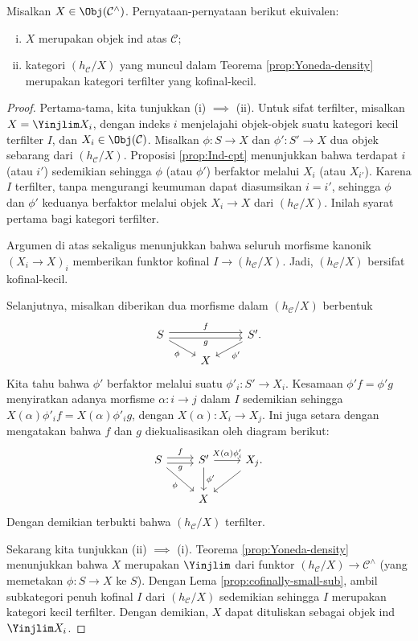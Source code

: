 \begin{proposition}\label{prop:recognize-ind}
	Misalkan $X \in \Obj(\mathcal{C}^\wedge)$. Pernyataan-pernyataan berikut ekuivalen:
	\begin{enumerate}[(i)]
		\item $X$ merupakan objek ind atas $\mathcal{C}$;
		\item kategori $(h_{\mathcal{C}}/X)$ yang muncul dalam Teorema \ref{prop:Yoneda-density} merupakan kategori terfilter yang kofinal-kecil.
	\end{enumerate}
\end{proposition}
\begin{proof}
	Pertama-tama, kita tunjukkan (i) $\implies$ (ii). Untuk sifat terfilter, misalkan $X = \Yinjlim X_i$, dengan indeks $i$ menjelajahi objek-objek suatu kategori kecil terfilter $I$, dan $X_i \in \Obj(\mathcal{C})$. Misalkan $\phi: S \to X$ dan $\phi': S' \to X$ dua objek sebarang dari $(h_{\mathcal{C}}/X)$. Proposisi \ref{prop:Ind-cpt} menunjukkan bahwa terdapat $i$ (atau $i'$) sedemikian sehingga $\phi$ (atau $\phi'$) berfaktor melalui $X_i$ (atau $X_{i'}$). Karena $I$ terfilter, tanpa mengurangi keumuman dapat diasumsikan $i = i'$, sehingga $\phi$ dan $\phi'$ keduanya berfaktor melalui objek $X_i \to X$ dari $(h_{\mathcal{C}}/X)$. Inilah syarat pertama bagi kategori terfilter.
	
	Argumen di atas sekaligus menunjukkan bahwa seluruh morfisme kanonik $(X_i \to X)_i$ memberikan funktor kofinal $I \to (h_{\mathcal{C}}/X)$. Jadi, $(h_{\mathcal{C}}/X)$ bersifat kofinal-kecil.
	
	Selanjutnya, misalkan diberikan dua morfisme dalam $(h_{\mathcal{C}}/X)$ berbentuk
	\[\begin{tikzcd}[row sep=small]
		S \arrow[rr, shift left, "f"] \arrow[rr, shift right, "g"'] \arrow[rd, "\phi"'] & & S' . \arrow[ld, "{\phi'}"] \\
		& X &
	\end{tikzcd}\]
	Kita tahu bahwa $\phi'$ berfaktor melalui suatu $\phi'_i: S' \to X_i$. Kesamaan $\phi' f = \phi' g$ menyiratkan adanya morfisme $\alpha: i \to j$ dalam $I$ sedemikian sehingga $X(\alpha) \phi'_i f = X(\alpha) \phi'_i g$, dengan $X(\alpha): X_i \to X_j$. Ini juga setara dengan mengatakan bahwa $f$ dan $g$ diekualisasikan oleh diagram berikut:
	\[\begin{tikzcd}
		S \arrow[r, shift left, "f"] \arrow[r, shift right, "g"'] \arrow[rd, "\phi"'] & S' \arrow[d, "{\phi'}"] \arrow[r, "{X(\alpha) \phi'_i}"] & X_j . \arrow[ld] \\
		& X &
	\end{tikzcd}\]
	Dengan demikian terbukti bahwa $(h_{\mathcal{C}}/X)$ terfilter.
	
	Sekarang kita tunjukkan (ii) $\implies$ (i). Teorema \ref{prop:Yoneda-density} menunjukkan bahwa $X$ merupakan $\Yinjlim$ dari funktor $(h_{\mathcal{C}}/X) \to \mathcal{C}^\wedge$ (yang memetakan $\phi: S \to X$ ke $S$). Dengan Lema \ref{prop:cofinally-small-sub}, ambil subkategori penuh kofinal $I$ dari $(h_{\mathcal{C}}/X)$ sedemikian sehingga $I$ merupakan kategori kecil terfilter. Dengan demikian, $X$ dapat dituliskan sebagai objek ind $\Yinjlim X_i$.
\end{proof}

